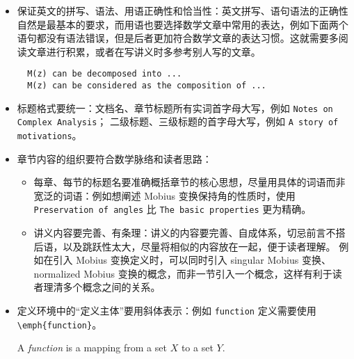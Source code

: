 \begin{itemize}
  \item 保证英文的拼写、语法、用语正确性和恰当性：英文拼写、语句语法的正确性自然是最基本的要求，而用语也要选择数学文章中常用的表达，例如下面两个语句都没有语法错误，但是后者更加符合数学文章的表达习惯。这就需要多阅读文章进行积累，或者在写讲义时多参考别人写的文章。
  \begin{lstlisting}
  M(z) can be decomposed into ...
  M(z) can be considered as the composition of ...
  \end{lstlisting}
  \item 标题格式要统一：文档名、章节标题所有实词首字母大写，例如 \lstinline|Notes on Complex Analysis|；
  二级标题、三级标题的首字母大写，例如 \lstinline|A story of motivations|。
  \item 章节内容的组织要符合数学脉络和读者思路：
    \begin{itemize}
      \item 每章、每节的标题名要准确概括章节的核心思想，尽量用具体的词语而非宽泛的词语：例如想阐述 Mobius 变换保持角的性质时，使用 \lstinline|Preservation of angles| 比 \lstinline|The basic properties| 更为精确。
      \item 讲义内容要完善、有条理：讲义的内容要完善、自成体系，切忌前言不搭后语，以及跳跃性太大，尽量将相似的内容放在一起，便于读者理解。
      例如在引入 Mobius 变换定义时，可以同时引入 singular Mobius 变换、 normalized Mobius 变换的概念，而非一节引入一个概念，这样有利于读者理清多个概念之间的关系。
    \end{itemize}
  \item 定义环境中的“定义主体”要用斜体表示：例如 \lstinline|function| 定义需要使用 \lstinline|\emph{function}|。
  \begin{definition}
    \label{def:function}
    \textnormal{A \emph{function} is a mapping from a set $X$ to a set $Y$.}
  \end{definition}


\end{itemize}
